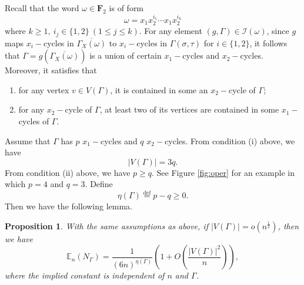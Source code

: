 \documentclass{amsart}
\theoremstyle{plain}
\newtheorem{proposition}[theorem]{Proposition}
\theoremstyle{definition}
\theoremstyle{remark}
\begin{document}
Recall that the word $\omega\in\textbf{F}_2$ is of form  
$$\omega=x_1x_2^{i_1}\cdots x_1x_2^{i_k}$$
where $k\geq 1,\ i_j\in\{1,2\}\ (1\leq j\leq k)$. For any element $(g,\Gamma)\in\mathcal{I}(\omega)$, since $g$ maps $x_i-$cycles in $\overline{\Gamma_X(\omega)}$ to $x_i-$cycles in $\Gamma(\sigma, \tau)$ for $i\in\{1,2\}$, it follows that $\Gamma=g\left(\overline{\Gamma_X(\omega)}\right)$ is a union of certain $x_1-$cycles and $x_2-$cycles. Moreover, it satisfies that
\begin{enumerate}
    \item for any vertex $v\in V(\Gamma)$, it is contained in some an $x_2-$cycle of $\Gamma$;
    \item for any $x_2-$cycle of $\Gamma$, at least two of its vertices are contained in some $x_1-$cycles of $\Gamma$.
\end{enumerate}
Assume that $\Gamma$ has $p$ $x_1-$cycles and $q$ $x_2-$cycles. From condition (i) above, we have
$$|V(\Gamma)|=3q.$$
From condition (ii) above, we have $p\geq q$. See Figure \ref{fig:oper} for an example in which $p=4$ and $q=3$. Define $$\eta(\Gamma)\overset{\mathrm{def}}{=}p-q\geq 0.$$
Then we have the following lemma.
\begin{proposition}\label{l-count}
    With the same assumptions as above, if $|V(\Gamma)|=o\left(n^\frac{1}{2}\right)$, then we have
    $$\mathbb{E}_n(N_\Gamma)=\frac{1}{(6n)^{\eta(\Gamma)}}\left(1+O\left(\frac{|V(\Gamma)|^2}{n}\right)\right),$$
    where the implied constant is independent of $n$ and $\Gamma$.  
\end{proposition}
\end{document}
